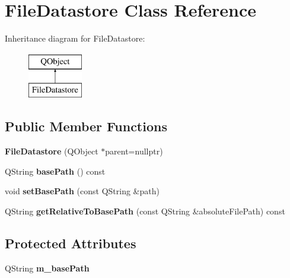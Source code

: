 \hypertarget{class_file_datastore}{}\section{File\+Datastore Class Reference}
\label{class_file_datastore}
Inheritance diagram for File\+Datastore\+:\begin{figure}[H]
\begin{center}
\leavevmode
\includegraphics[height=2.000000cm]{class_file_datastore}
\end{center}
\end{figure}
\subsection*{Public Member Functions}
\begin{DoxyCompactItemize}
\item 
\mbox{\label{class_file_datastore_a40efdf5a17f50172b477b34fd6423dda}} 
{\bfseries File\+Datastore} (Q\+Object $\ast$parent=nullptr)
\item 
\mbox{\label{class_file_datastore_a704f5f11d68f1778b554c32ff5525235}} 
Q\+String {\bfseries base\+Path} () const
\item 
\mbox{\label{class_file_datastore_aa4c12673e57d0aa51c05f691051e859b}} 
void {\bfseries set\+Base\+Path} (const Q\+String \&path)
\item 
\mbox{\label{class_file_datastore_a9b66a3ef7f5fe951a1601f7b5b8271e4}} 
Q\+String {\bfseries get\+Relative\+To\+Base\+Path} (const Q\+String \&absolute\+File\+Path) const
\end{DoxyCompactItemize}
\subsection*{Protected Attributes}
\begin{DoxyCompactItemize}
\item 
\mbox{\label{class_file_datastore_a66a2fe6eb0ed3d1417b306bb0b237e53}} 
Q\+String {\bfseries m\+\_\+base\+Path}
\end{DoxyCompactItemize}
